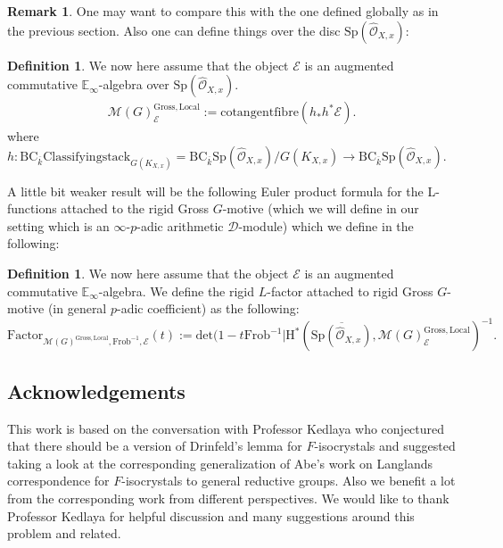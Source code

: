 \documentclass[11pt]{book}
\theoremstyle{definition}
\newtheorem{definition}[theorem]{Definition}
\newtheorem{remark}[theorem]{Remark}
\numberwithin{equation}{section}
\begin{document}
\begin{remark}
One may want to compare this with the one defined globally as in the previous section. Also one can define things over the disc $\mathrm{Sp}(\widehat{\mathcal{O}}_{X,x})$:
\begin{definition}
We now here assume that the object $\mathcal{E}$ is an augmented commutative $\mathbb{E}_\infty$-algebra over $\mathrm{Sp}(\widehat{\mathcal{O}}_{X,x})$.
\begin{align}
\mathcal{M}(G)^\mathrm{Gross,Local}_\mathcal{E}:= \mathrm{cotangentfibre}(h_*h^*\mathcal{E}).	
\end{align}
where $h: \mathrm{BC}_{\overline{k}}\mathrm{Classifyingstack}_{G(K_{X,x})}=\mathrm{BC}_{\overline{k}}\mathrm{Sp}(\widehat{\mathcal{O}}_{X,x})/{G(K_{X,x})} \rightarrow \mathrm{BC}_{\overline{k}}\mathrm{Sp}(\widehat{\mathcal{O}}_{X,x})$.
\end{definition}
\noindent A little bit weaker result will be the following Euler product formula for the L-functions attached to the rigid Gross $G$-motive (which we will define in our setting which is an $\infty$-$p$-adic arithmetic $\mathcal{D}$-module) which we define in the following:
\begin{definition}
We now here assume that the object $\mathcal{E}$ is an augmented commutative $\mathbb{E}_\infty$-algebra. We define the rigid $L$-factor attached to rigid Gross $G$-motive (in general $p$-adic coefficient) as the following:
\begin{displaymath}
\mathrm{Factor}_{\mathcal{M}(G)^\mathrm{Gross,Local},\mathrm{Frob}^{-1},\mathcal{E}}(t):=\mathrm{det}(1-t\mathrm{Frob}^{-1}|\mathrm{H}^*(\overline{\mathrm{Sp}(\widehat{\mathcal{O}}_{X,x})},\mathcal{M}(G)^\mathrm{Gross,Local}_\mathcal{E})^{-1}.
\end{displaymath}
\end{definition}	
\end{remark}







\newpage

\subsection*{Acknowledgements} 
This work is based on the conversation with Professor Kedlaya who conjectured that there should be a version of Drinfeld's lemma for $F$-isocrystals and suggested taking a look at the corresponding generalization of Abe's work on Langlands correspondence for $F$-isocrystals to general reductive groups. Also we benefit a lot from the corresponding work \cite{Ked9} from different perspectives. We would like to thank Professor Kedlaya for helpful discussion and many suggestions around this problem and related. 
\end{document}

